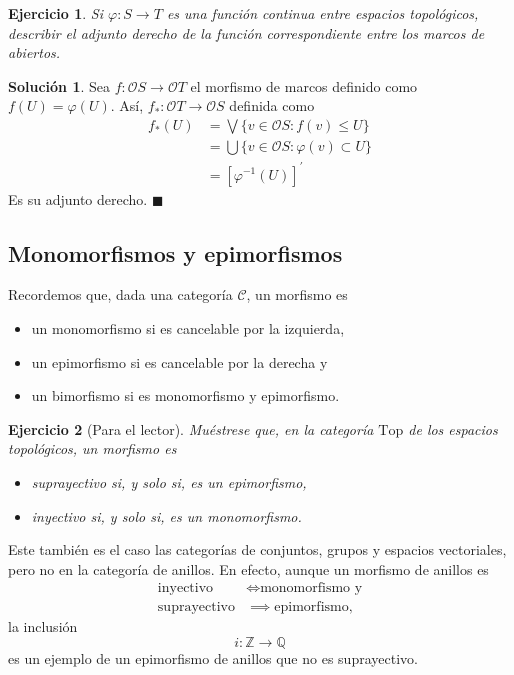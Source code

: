 \documentclass[12pt,letterpaper,titlepage]{article}
\newcommand{\xqed}[1]{%
  \leavevmode\unskip\penalty9999 \hbox{}\nobreak\hfill
  \quad\hbox{\ensuremath{#1}}}
\newtheorem{exe}{Ejercicio}
\theoremstyle{definition}
\newtheorem*{soltemp}{Solución}
\newenvironment{sol}[1]{%
    \begin{soltemp}#1}{%
    \xqed{\blacksquare}\end{soltemp}%
}
\newcommand\Sup{\bigvee}
\renewcommand\phi{\varphi}
\renewcommand\cal[1]{\mathcal{#1}}
\newcommand\<{\langle}
\renewcommand\>{\rangle}
\newcommand{\Top}{\mathrm{Top}}
\begin{document}
\begin{exe}%
  Si $\phi:S\to T$ es una función continua entre espacios
  topológicos, describir el adjunto derecho de la función
  correspondiente entre los marcos de abiertos.
\end{exe}
\begin{sol}
    Sea $f:\mathscr{O}S\to\mathscr{O}T$ el morfismo de marcos definido como $f(U)=\phi(U)$. Así, $f_*:\mathscr{O}T\to\mathscr{O}S$ definida como 
    \begin{align*}
        f_*(U)&=\Sup\{v\in\mathscr{O}S:f(v)\leq U\}\\
        &=\bigcup\{v\in\mathscr{O}S:\phi(v)\subset U\}\\
        &=\left[\phi^{-1}(U)\right]^{\prime}
    \end{align*}
    Es su adjunto derecho.
\end{sol}

\subsection{Monomorfismos y epimorfismos}

Recordemos que, dada una categoría $\cal C$, un morfismo es
\begin{itemize}
    \item un monomorfismo si es cancelable por la izquierda,
    \item un epimorfismo si es cancelable por la derecha y
    \item un bimorfismo si es monomorfismo y epimorfismo.
\end{itemize}

\begin{exe}[Para el lector]%
    Muéstrese que, en la categoría $\Top$ de los espacios topológicos,
    un morfismo es
    \begin{itemize}
        \item suprayectivo si, y solo si, es un epimorfismo,
        \item inyectivo si, y solo si, es un monomorfismo.
    \end{itemize}
\end{exe}

Este también es el caso las categorías de conjuntos, grupos y
espacios vectoriales, pero no en la categoría de anillos.
En efecto, aunque un morfismo de anillos es
\begin{align*}
    \text{inyectivo} &\iff \text{monomorfismo y} \\
    \text{suprayectivo} &\implies \text{epimorfismo},
\end{align*}
la inclusión
\[
    i:\mathbb Z\to\mathbb Q
\]
es un ejemplo de un epimorfismo de anillos que no es suprayectivo.
\end{document}
